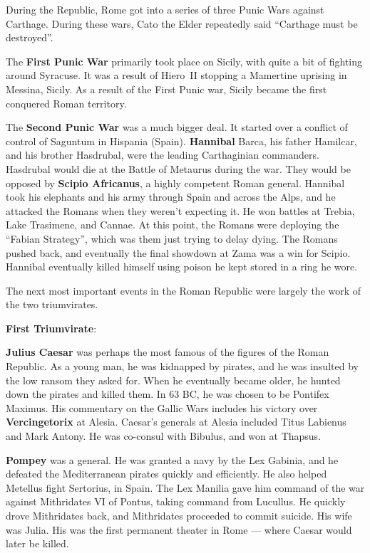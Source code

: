 During the Republic, Rome got into a series of three Punic Wars against Carthage.
During these wars, Cato the Elder repeatedly said ``Carthage must be destroyed''.

The \textbf{First Punic War} primarily took place on Sicily, with quite a bit of fighting around Syracuse.
It was a result of Hiero~II stopping a Mamertine uprising in Messina, Sicily.
As a result of the First Punic war, Sicily became the first conquered Roman territory.

The \textbf{Second Punic War} was a much bigger deal.
It started over a conflict of control of Saguntum in Hispania (Spain).
\textbf{Hannibal} Barca, his father Hamilcar, and his brother Hasdrubal, were the leading Carthaginian commanders.
Hasdrubal would die at the Battle of Metaurus during the war.
They would be opposed by \textbf{Scipio Africanus}, a highly competent Roman general.
Hannibal took his elephants and his army through Spain and across the Alps,
and he attacked the Romans when they weren't expecting it.
He won battles at Trebia, Lake Trasimene, and Cannae.
At this point, the Romans were deploying the ``Fabian Strategy'', which was them just trying to delay dying.
The Romans pushed back, and eventually the final showdown at Zama was a win for Scipio.
Hannibal eventually killed himself using poison he kept stored in a ring he wore.


The next most important events in the Roman Republic were largely the work of the two triumvirates.

\textbf{First Triumvirate}:

\textbf{Julius Caesar} was perhaps the most famous of the figures of the Roman Republic.
As a young man, he was kidnapped by pirates, and he was insulted by the low ransom they asked for.
When he eventually became older, he hunted down the pirates and killed them.
In 63 BC, he was chosen to be Pontifex Maximus.
His commentary on the Gallic Wars includes his victory over \textbf{Vercingetorix} at Alesia.
Caesar's generals at Alesia included Titus Labienus and Mark Antony.
He was co-consul with Bibulus, and won at Thapsus.

\textbf{Pompey} was a general. He was granted a navy by the Lex Gabinia, and he defeated
the Mediterranean pirates quickly and efficiently.
He also helped Metellus fight Sertorius, in Spain.
The Lex Manilia gave him command of the war against Mithridates VI of Pontus, taking command from Lucullus.
He quickly drove Mithridates back, and Mithridates proceeded to commit suicide.
His wife was Julia.
His was the first permanent theater in Rome --- where Caesar would later be killed.

